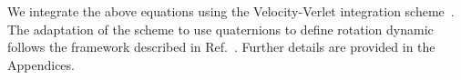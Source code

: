 We integrate the above equations using the Velocity-Verlet integration scheme~\cite{Taylor2013}. The adaptation of the scheme to use quaternions to define rotation dynamic follows the framework described in Ref.~. Further details are provided in the Appendices.

%

